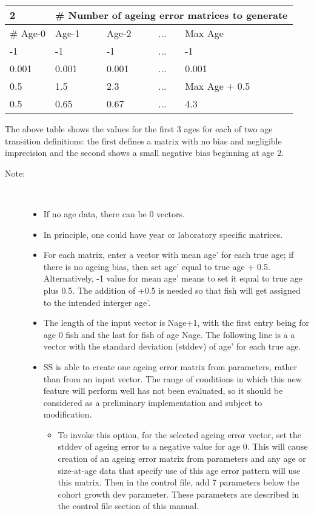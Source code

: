 \begin{center}
	\begin{tabular}{p{2cm} p{2cm} p{2cm} p{2cm} p{3cm} }
		\hline
		\multicolumn{1}{l}{2} & \multicolumn{4}{l}{\# Number of ageing error matrices to generate}\\
		\hline
		\# Age-0 & Age-1 & Age-2  &  ... & Max Age\\
		\hline
		-1 & -1 & -1  & ... & -1 \\
		0.001 & 0.001 & 0.001 & ... & 0.001 \\
		\hline
		0.5 & 1.5 & 2.3 & ... & Max Age + 0.5 \\
		0.5 & 0.65 & 0.67 & ... & 4.3 \\
		\hline
	\end{tabular}
\end{center}
The above table shows the values for the first 3 ages for each of two age transition definitions: the first defines a matrix with no bias and negligible imprecision and the second shows a small negative bias beginning at age 2.

\begin{description}
	\item[Note:]\
	\begin{itemize}		
		\item If no age data, there can be 0 vectors.
		\item In principle, one could have year or laboratory specific matrices.
		\item For each matrix, enter a vector with mean age’ for each true age; if there is no ageing bias, then set age’ equal to true age + 0.5.  Alternatively, -1 value for mean age’ means to set it equal to true age plus 0.5.  The addition of +0.5 is needed so that fish will get assigned to the intended interger age’.
		\item The length of the input vector is Nage+1, with the first entry being for age 0 fish and the last for fish of age Nage. The following line is a a vector with the standard deviation (stddev) of age’ for each true age.
		\item SS is able to create one ageing error matrix from parameters, rather than from an input vector.  The range of conditions in which this new feature will perform well has not been evaluated, so it should be considered as a preliminary implementation and subject to modification.
			\begin{itemize}
				\item To invoke this option, for the selected ageing error vector, set the stddev of ageing error to a negative value for age 0.  This will cause creation of an ageing error matrix from parameters and any age or size-at-age data that specify use of this age error pattern will use this matrix. Then in the control file, add 7 parameters below the cohort growth dev parameter.  These parameters are described in the control file section of this manual.
			\end{itemize}			  
	\end{itemize}
\end{description}

